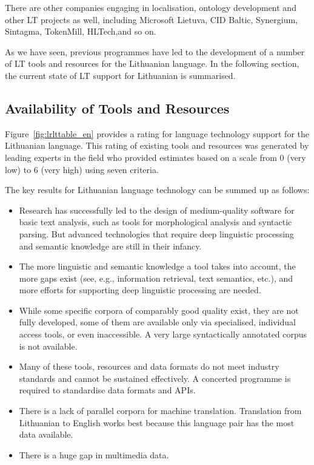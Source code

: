 \begin{multicols}{2}
There are other companies engaging in localisation, ontology development and other LT projects as well, including Microsoft Lietuva, CID Baltic, Synergium, Sintagma, TokenMill, HLTech,and so on. 

    As we have seen, previous programmes have led to the development of a number of LT tools and resources for the Lithuanian language. In the following section, the current state of LT support for Lithuanian is summarised.
  
\subsection{Availability of Tools and Resources}

Figure~\ref{fig:lrlttable_en} provides a rating for language technology support for the Lithuanian language. This rating of existing tools and resources was generated by leading experts in the field who provided estimates based on a scale from 0 (very low) to 6 (very high) using seven criteria.


The key results for Lithuanian language technology can be summed up as follows:

\begin{itemize}
\item Research has successfully led to the design of medium-quality software for basic text analysis, such as tools for morphological analysis and syntactic parsing. But advanced technologies that require deep linguistic processing and semantic knowledge are still in their infancy. 
\item The more linguistic and semantic knowledge a tool takes into account, the more gaps exist (see, e.g., information retrieval, text semantics, etc.), and more efforts for supporting deep linguistic processing are needed. 
\item While some specific corpora of comparably good quality exist, they are not fully developed, some of them are available only via specialised, individual access tools, or even inaccessible. A very large syntactically annotated corpus is not available. 
\item Many of these tools, resources and data formats do not meet industry standards and cannot be sustained effectively. A concerted programme is required to standardise data formats and APIs. 
\item There is a lack of parallel corpora for machine translation. Translation from Lithuanian to English works best because this language pair has the most data available.
\item There is a huge gap in multimedia data.
\end{itemize}


\end{multicols}

